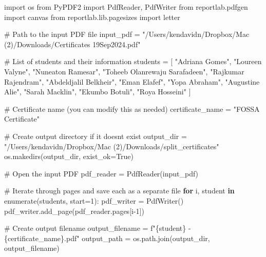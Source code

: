 \documentclass[
  letterpaper,
  DIV=11,
  numbers=noendperiod]{scrreprt}
\newenvironment{Shaded}{\begin{snugshade}}{\end{snugshade}}
\newcommand{\BuiltInTok}[1]{\textcolor[rgb]{0.00,0.23,0.31}{#1}}
\newcommand{\CommentTok}[1]{\textcolor[rgb]{0.37,0.37,0.37}{#1}}
\newcommand{\ControlFlowTok}[1]{\textcolor[rgb]{0.00,0.23,0.31}{\textbf{#1}}}
\newcommand{\DecValTok}[1]{\textcolor[rgb]{0.68,0.00,0.00}{#1}}
\newcommand{\ImportTok}[1]{\textcolor[rgb]{0.00,0.46,0.62}{#1}}
\newcommand{\KeywordTok}[1]{\textcolor[rgb]{0.00,0.23,0.31}{\textbf{#1}}}
\newcommand{\NormalTok}[1]{\textcolor[rgb]{0.00,0.23,0.31}{#1}}
\newcommand{\OperatorTok}[1]{\textcolor[rgb]{0.37,0.37,0.37}{#1}}
\newcommand{\SpecialCharTok}[1]{\textcolor[rgb]{0.37,0.37,0.37}{#1}}
\newcommand{\SpecialStringTok}[1]{\textcolor[rgb]{0.13,0.47,0.30}{#1}}
\newcommand{\StringTok}[1]{\textcolor[rgb]{0.13,0.47,0.30}{#1}}
\newcommand{\VariableTok}[1]{\textcolor[rgb]{0.07,0.07,0.07}{#1}}
\begin{document}
\begin{Shaded}
\begin{Highlighting}[]
\ImportTok{import}\NormalTok{ os}
\ImportTok{from}\NormalTok{ PyPDF2 }\ImportTok{import}\NormalTok{ PdfReader, PdfWriter}
\ImportTok{from}\NormalTok{ reportlab.pdfgen }\ImportTok{import}\NormalTok{ canvas}
\ImportTok{from}\NormalTok{ reportlab.lib.pagesizes }\ImportTok{import}\NormalTok{ letter}

\CommentTok{\# Path to the input PDF file}
\NormalTok{input\_pdf }\OperatorTok{=} \StringTok{"/Users/kendavidn/Dropbox/Mac (2)/Downloads/Certificates 19Sep2024.pdf"}

\CommentTok{\# List of students and their information}
\NormalTok{students }\OperatorTok{=}\NormalTok{ [}
    \StringTok{"Adriana Gomes"}\NormalTok{,}
    \StringTok{"Loureen Valyne"}\NormalTok{,}
    \StringTok{"Nuneaton Ramesar"}\NormalTok{,}
    \StringTok{"Toheeb Olanrewaju Sarafadeen"}\NormalTok{,}
    \StringTok{"Rajkumar Rajendram"}\NormalTok{,}
    \StringTok{"Abdeldjalil Belkheir"}\NormalTok{,}
    \StringTok{"Eman Elafef"}\NormalTok{,}
    \StringTok{"Yopa Abraham"}\NormalTok{,}
    \StringTok{"Augustine Alie"}\NormalTok{,}
    \StringTok{"Sarah Macklin"}\NormalTok{,}
    \StringTok{"Ekumbo Botuli"}\NormalTok{,}
    \StringTok{"Roya Hosseini"}
\NormalTok{]}

\CommentTok{\# Certificate name (you can modify this as needed)}
\NormalTok{certificate\_name }\OperatorTok{=} \StringTok{"FOSSA Certificate"}

\CommentTok{\# Create output directory if it doesn\textquotesingle{}t exist}
\NormalTok{output\_dir }\OperatorTok{=} \StringTok{"/Users/kendavidn/Dropbox/Mac (2)/Downloads/split\_certificates"}
\NormalTok{os.makedirs(output\_dir, exist\_ok}\OperatorTok{=}\VariableTok{True}\NormalTok{)}

\CommentTok{\# Open the input PDF}
\NormalTok{pdf\_reader }\OperatorTok{=}\NormalTok{ PdfReader(input\_pdf)}

\CommentTok{\# Iterate through pages and save each as a separate file}
\ControlFlowTok{for}\NormalTok{ i, student }\KeywordTok{in} \BuiltInTok{enumerate}\NormalTok{(students, start}\OperatorTok{=}\DecValTok{1}\NormalTok{):}
\NormalTok{    pdf\_writer }\OperatorTok{=}\NormalTok{ PdfWriter()}
\NormalTok{    pdf\_writer.add\_page(pdf\_reader.pages[i}\OperatorTok{{-}}\DecValTok{1}\NormalTok{])}
    
    \CommentTok{\# Create output filename}
\NormalTok{    output\_filename }\OperatorTok{=} \SpecialStringTok{f"}\SpecialCharTok{\{}\NormalTok{student}\SpecialCharTok{\}}\SpecialStringTok{ {-} }\SpecialCharTok{\{}\NormalTok{certificate\_name}\SpecialCharTok{\}}\SpecialStringTok{.pdf"}
\NormalTok{    output\_path }\OperatorTok{=}\NormalTok{ os.path.join(output\_dir, output\_filename)}
    

\end{Highlighting}
\end{Shaded}
\end{document}
